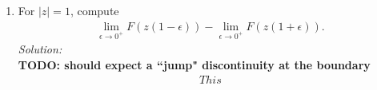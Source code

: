 \documentclass[10pt]{amsart}
\theoremstyle{nonumberplain}
\begin{document}
\begin{enumerate}[label={\bf {\arabic*}:}]
\begin{enumerate}
\item For $|z| = 1$, compute
\begin{align*}
\lim_{\epsilon \to 0^+} F( z(1 - \epsilon)) -       \lim_{\epsilon \to 0^+} F( z(1 + \epsilon)) .
\end{align*}
\textit{Solution:} \\
\textbf{TODO: should expect a ``jump" discontinuity at the boundary}
\begin{align*}
This
\end{align*}

\end{enumerate}
\end{enumerate}
\end{document}
